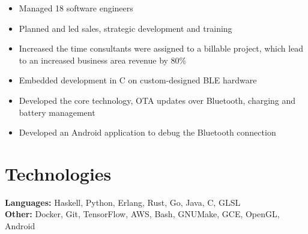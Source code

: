 \documentclass{cv_doc}
\begin{document}

\begin{itemize}[label={\tiny\raisebox{1ex}{\textbullet}}]
  \item {Managed 18 software engineers}
  \item {Planned and led sales, strategic development and training}
  \item {Increased the time consultants were assigned to a billable project,
  which lead to an increased business area revenue by 80\%}
\end{itemize}


\begin{itemize}[label={\tiny\raisebox{1ex}{\textbullet}}]
  \item {Embedded development in C on custom-designed BLE hardware}
  \item {Developed the core technology, OTA updates over Bluetooth, charging
  and battery management}
  \item {Developed an Android application to debug the Bluetooth connection}
\end{itemize}

\section*{Technologies}

\textbf{Languages:} Haskell, Python, Erlang, Rust, Go, Java, C, GLSL \\
\textbf{Other:} Docker, Git, TensorFlow, AWS, Bash, GNUMake, GCE, OpenGL,
Android
\end{document}
